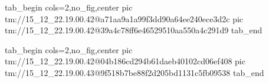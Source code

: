  
 
 
 
 

\qqSecOrig


\ifcmt
  tab_begin cols=2,no_fig,center
    pic tm://15_12_22.19.00.42@a71aa9a1a99f3dd90a64ee240ece3d2c
    pic tm://15_12_22.19.00.42@39a4c78ff6e46529510aa550a4c291d9
  tab_end
\fi


\ifcmt
  tab_begin cols=2,no_fig,center
    pic tm://15_12_22.19.00.42@04b186cd294b61daeb40102cd06ef408
    pic tm://15_12_22.19.00.43@9f518b7be88f2d205bd1131c5fb09538
  tab_end
\fi

